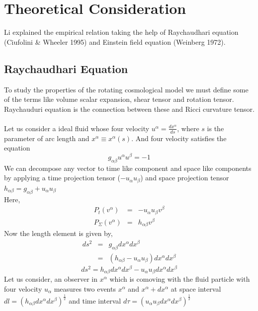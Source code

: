 \section{Theoretical Consideration}
Li explained the empirical relation taking the help of Raychaudhari equation (Ciufolini \& Wheeler 1995) and Einstein field equation (Weinberg 1972).
\subsection{Raychaudhari Equation}
To study the properties of the rotating cosmological model we must define some of the terms like volume scalar expansion, shear tensor and rotation tensor. Raychauduri equation is the connection between these and Ricci curvature tensor.\\\\
Let us consider a ideal fluid whose four velocity $u^\alpha=\frac{dx^\alpha}{ds}$, where $s$ is the parameter of arc length and $x^\alpha\equiv x^\alpha(s)$. And four velocity satisfies the equation
\begin{equation}\label{g_ab}
g_{\alpha\beta}u^\alpha u^\beta=-1
\end{equation}
We can decompose any vector to time like component and space like components by applying a time projection tensor ($-u_\alpha u_\beta$) and space projection tensor $h_{\alpha\beta}=g_{\alpha\beta}+u_\alpha u_\beta$\\
Here,
\begin{eqnarray}\label{projection_time_space}
P_t(v^\alpha)&=&-u_\alpha u_\beta v^\beta\\
P_\Sigma(v^\alpha)&=&h_{\alpha\beta}v^\beta
\end{eqnarray}
Now the length element is given by,
\begin{eqnarray*}
ds^2&=&g_{\alpha\beta} dx^\alpha dx^\beta\\
&=&(h_{\alpha\beta} -u_\alpha u_\beta)dx^\alpha dx^\beta
\end{eqnarray*}
\begin{equation}
ds^2=h_{\alpha\beta}dx^\alpha dx^\beta -u_\alpha u_\beta dx^\alpha dx^\beta
\end{equation}
Let us consider, an observer in $x^\alpha$ which is comoving with the fluid particle with four velocity $u_\alpha$ measures two events $x^\alpha$ and $x^\alpha+dx^\alpha$ at space interval $dl=(h_{\alpha\beta}dx^\alpha dx^\beta)^\frac{1}{2}$ and time interval $d\tau=(u_\alpha u_\beta dx^\alpha dx^\beta)^\frac{1}{2}$\\\\
